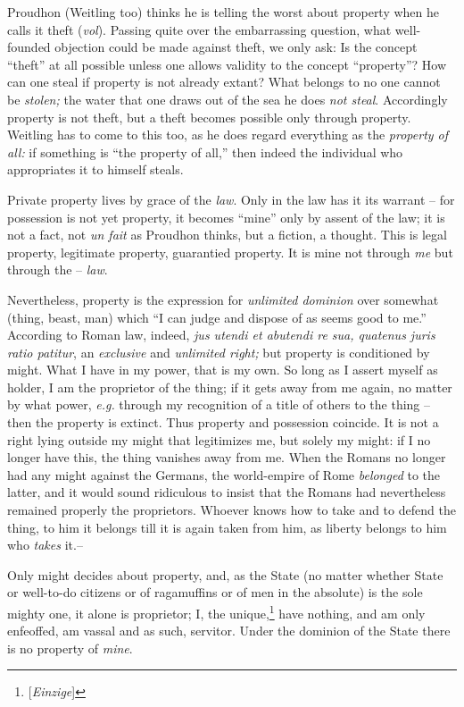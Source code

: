 \myhrule


Proudhon (Weitling too) thinks he is telling the worst about property when he 
calls it theft (\textit{vol}). Passing quite over the embarrassing question, 
what well-founded objection could be made against theft, we only ask: Is the 
concept ``theft'' at all possible unless one allows validity to the concept 
``property''? How can one steal if property is not already extant? What 
belongs to no one cannot be \textit{stolen;} the water that one draws out of 
the sea he does \textit{not steal}. Accordingly property is not theft, but a 
theft becomes possible only through property. Weitling has to come to this 
too, as he does regard everything as the \textit{property of all:} if 
something is ``the property of all,'' then indeed the individual who 
appropriates it to himself steals.

Private property lives by grace of the \textit{law}. Only in the law has it 
its warrant -- for possession is not yet property, it becomes ``mine'' only 
by assent of the law; it is not a fact, not \textit{un fait} as Proudhon 
thinks, but a fiction, a thought. This is legal property, legitimate property, 
guarantied property. It is mine not through \textit{me} but through the -- 
\textit{law}.

Nevertheless, property is the expression for \textit{unlimited dominion} over 
somewhat (thing, beast, man) which ``I can judge and dispose of as seems good 
to me.'' According to Roman law, indeed, \textit{jus utendi et abutendi re 
sua, quatenus juris ratio patitur}, an \textit{exclusive} and 
\textit{unlimited right;} but property is conditioned by might. What I have in 
my power, that is my own. So long as I assert myself as holder, I am the 
proprietor of the thing; if it gets away from me again, no matter by what 
power, \textit{e.g.} through my recognition of a title of others to the thing  -- then the property is extinct. Thus property and possession coincide. It is 
not a right lying outside my might that legitimizes me, but solely my might: 
if I no longer have this, the thing vanishes away from me. When the Romans no 
longer had any might against the Germans, the world-empire of Rome 
\textit{belonged} to the latter, and it would sound ridiculous to insist that 
the Romans had nevertheless remained properly the proprietors. Whoever knows 
how to take and to defend the thing, to him it belongs till it is again taken 
from him, as liberty belongs to him who \textit{takes} it.--

Only might decides about property, and, as the State (no matter whether State 
or well-to-do citizens or of ragamuffins or of men in the absolute) is the 
sole mighty one, it alone is proprietor; I, the 
unique,\footnote{[\textit{Einzige}]} have nothing, and am only enfeoffed, am 
vassal and as such, servitor. Under the dominion of the State there is no 
property of \textit{mine}.

